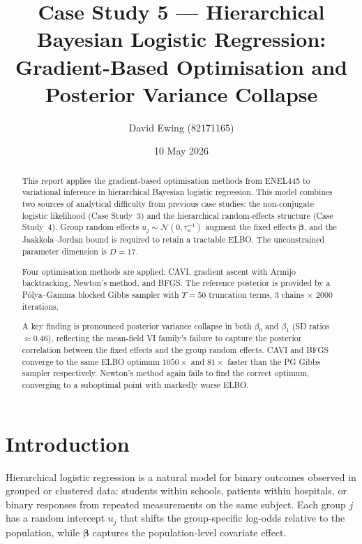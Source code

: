 \documentclass[11pt,a4paper]{article}
\title{
Case Study 5 --- Hierarchical Bayesian Logistic Regression:\\[0.4em]
Gradient-Based Optimisation and Posterior Variance Collapse
}
\author{
  David Ewing (82171165)
}
\date{10 May 2026}
\begin{document}
\maketitle

\begin{abstract}
\setlength{\parindent}{0pt}
\setlength{\parskip}{0.7em}

This report applies the gradient-based optimisation methods from ENEL445 to variational
inference in hierarchical Bayesian logistic regression.
This model combines two sources of analytical difficulty from previous case studies:
the non-conjugate logistic likelihood (Case Study~3) and the hierarchical random-effects
structure (Case Study~4).
Group random effects $u_j \sim \mathcal{N}(0,\tau_u^{-1})$ augment the fixed effects
$\bm{\beta}$, and the Jaakkola--Jordan \parencite{Jaakkola2000} bound is required to
retain a tractable ELBO.
The unconstrained parameter dimension is $D=17$.

Four optimisation methods are applied: CAVI, gradient ascent with Armijo backtracking,
Newton's method, and BFGS.
The reference posterior is provided by a P\'{o}lya--Gamma blocked Gibbs sampler
\parencite{Polson2013} with $T=50$ truncation terms, 3 chains $\times$ 2000 iterations.

A key finding is pronounced posterior variance collapse in both $\beta_0$ and $\beta_1$
(SD ratios $\approx 0.46$), reflecting the mean-field VI family's failure to capture
the posterior correlation between the fixed effects and the group random effects.
CAVI and BFGS converge to the same ELBO optimum $1050\times$ and $81\times$ faster
than the PG Gibbs sampler respectively.
Newton's method again fails to find the correct optimum, converging to a suboptimal
point with markedly worse ELBO.

\end{abstract}

\newpage

\section*{Introduction}

Hierarchical logistic regression is a natural model for binary outcomes observed in
grouped or clustered data: students within schools, patients within hospitals, or
binary responses from repeated measurements on the same subject.
Each group $j$ has a random intercept $u_j$ that shifts the group-specific log-odds
relative to the population, while $\bm{\beta}$ captures the population-level
covariate effect.
\end{document}
